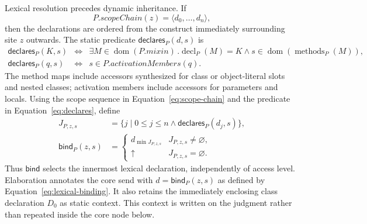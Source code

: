 \documentclass[11pt]{article}
\numberwithin{equation}{section}
\newcommand{\undef}{\mathord{\uparrow}}
\newcommand{\dom}{\mathop{\mathrm{dom}}}
\newcommand{\decl}{\mathop{\mathrm{decl}}}
\newcommand{\methods}{\mathop{\mathrm{methods}}}
\begin{document}
Lexical resolution precedes dynamic inheritance.  If
\begin{equation}\label{eq:scope-chain}
 P.\mathit{scopeChain}(z)=\langle d_0,\ldots,d_n\rangle,
\end{equation}
then the declarations are ordered from the construct immediately surrounding
site $z$ outwards.  The static predicate $\mathsf{declares}_P(d,s)$ is
\begin{equation}\label{eq:declares}
\begin{array}{rcl}
 \mathsf{declares}_P(K,s)
 &\Longleftrightarrow&
   \exists M\in\dom(P.\mathit{mixin})\,.
   \decl_P(M)=K\land s\in\dom(\methods_P(M)),\\
 \mathsf{declares}_P(q,s)
 &\Longleftrightarrow&
   s\in P.\mathit{activationMembers}(q).
\end{array}
\end{equation}
The method maps include accessors synthesized for class or object-literal slots
and nested classes; activation members include accessors for parameters and
locals.  Using the scope sequence in Equation~\eqref{eq:scope-chain} and the
predicate in Equation~\eqref{eq:declares}, define
\begin{equation}\label{eq:lexical-binding}
\begin{aligned}
 J_{P,z,s}&=\{j\mid 0\le j\le n\land
                         \mathsf{declares}_P(d_j,s)\},\\
 \mathsf{bind}_P(z,s)&=
 \begin{cases}
   d_{\min J_{P,z,s}} & J_{P,z,s}\ne\varnothing,\\
   \undef & J_{P,z,s}=\varnothing.
 \end{cases}
\end{aligned}
\end{equation}
Thus $\mathsf{bind}$ selects the innermost lexical declaration, independently
of access level.  Elaboration annotates the core send with
$d=\mathsf{bind}_P(z,s)$ as defined by
Equation~\eqref{eq:lexical-binding}.  It also retains the immediately enclosing class
declaration $D_0$ as static context.  This context is written on the judgment
rather than repeated inside the core node below.
\end{document}
